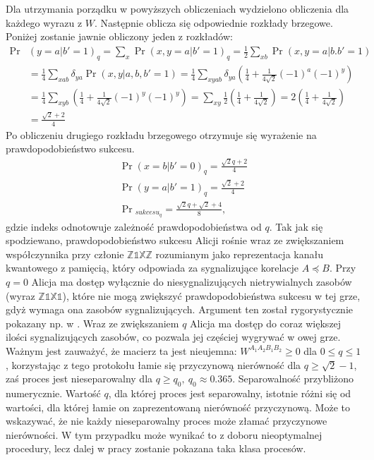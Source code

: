 \documentclass[10pt]{article} %
\newcommand{\WAll}{W^{A_1A_2B_1B_2}}
\newcommand{\X}{\mathbb{X}}
\newcommand{\Z}{\mathbb{Z}}
\newcommand{\I}{\mathbb{1}}
\begin{document}
Dla utrzymania porządku w powyższych obliczeniach wydzielono obliczenia dla każdego wyrazu z $W$.
Następnie oblicza się odpowiednie rozkłady brzegowe. Poniżej zostanie jawnie obliczony jeden z rozkładów:
\begin{equation}
\begin{split}
\Pr&(y=a|b'=1)_q = \sum_x \Pr(x, y=a|b'=1)_q = \frac{1}{2} \sum_{xb} \Pr(x, y=a|b. b'=1) \\&= \frac{1}{4}\sum_{xab} \delta_{ya} \Pr(x,y|a,b,b'=1)
= \frac{1}{4}\sum_{xyab} \delta_{ya} \left( \frac{1}{4}+\frac{1}{4\sqrt{2}} (-1)^a (-1)^y \right) \\&=  \frac{1}{4}\sum_{xyb} \left( \frac{1}{4}+\frac{1}{4\sqrt{2}} (-1)^y (-1)^y \right) = \sum_{xy} \frac{1}{2} \left( \frac{1}{4}+\frac{1}{4\sqrt{2}} \right) = 2\left(\frac{1}{4} + \frac{1}{4\sqrt{2}}\right) \\
&= \frac{\sqrt{2}+2}{4}
\end{split}
\end{equation}
Po obliczeniu drugiego rozkładu brzegowego otrzymuje się wyrażenie na prawdopodobieństwo sukcesu.
\begin{gather}
\Pr(x=b|b'=0)_q = \frac{\sqrt{2}q+2}{4} \\
\Pr(y=a|b'=1)_q = \frac{\sqrt{2}+2}{4} \\ 
\Pr{}_{sukcesu_q} = \frac{\sqrt{2}q + \sqrt{2} + 4}{8},
\end{gather}
gdzie indeks odnotowuje zależność prawdopodobieństwa od $q$. Tak jak się spodziewano, prawdopodobieństwo sukcesu Alicji rośnie wraz ze zwiększaniem współczynnika przy członie $\Z\I\X\Z$ rozumianym jako reprezentacja kanału kwantowego z pamięcią, który odpowiada za sygnalizujące korelacje $A \preceq B$.
Przy $q = 0$ Alicja ma dostęp wyłącznie do niesygnalizujących nietrywialnych zasobów (wyraz $\Z\I\X\I$), które nie mogą zwiększyć prawdopodobieństwa sukcesu w tej grze, gdyż wymaga ona zasobów sygnalizujących. Argument ten został rygorystycznie pokazany np. w \cite{mp_gyni}. Wraz ze zwiększaniem $q$ Alicja ma dostęp do coraz
większej ilości sygnalizujących zasobów, co pozwala jej częściej wygrywać w owej grze. Ważnym jest zauważyć, że macierz ta jest nieujemna: $\WAll \geq 0$ dla $0 \leq q \leq 1$, korzystając z tego protokołu łamie się przyczynową nierówność dla $q \geq \sqrt{2} - 1$, zaś proces jest nieseparowalny dla $q \geq q_0,~q_0 \approx 0.365$.
Separowalność przybliżono numerycznie. Wartość $q$, dla której proces jest separowalny, istotnie różni się od wartości, dla której łamie on zaprezentowaną nierówność przyczynową. Może to wskazywać, że nie każdy nieseparowalny proces może złamać przyczynowe nierówności. W tym przypadku może wynikać to z doboru nieoptymalnej procedury, lecz dalej w pracy zostanie pokazana taka klasa procesów.
\end{document}
